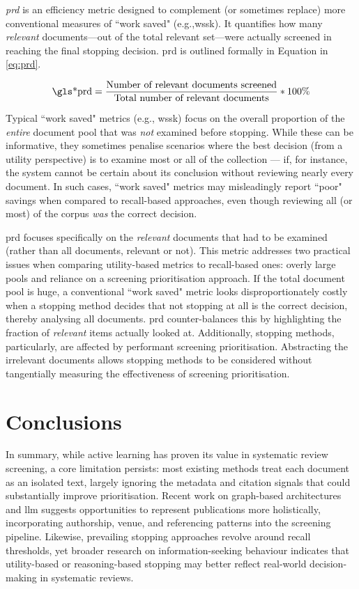 \documentclass[10pt,oneside]{book}
\begin{document}
\emph{\gls*{prd}} is an efficiency metric designed to complement (or sometimes replace) more conventional measures of ``work saved" (e.g.,\gls*{wssk}). It quantifies how many \emph{relevant} documents—out of the total relevant set—were actually screened in reaching the final stopping decision. \gls*{prd} is outlined formally in Equation in \ref{eq:prd}.

\begin{equation}
\text{\gls*{prd}} = \frac{\text{Number of relevant documents screened}}{\text{Total number of relevant documents}} * 100\%
\label{eq:prd}
\end{equation}

Typical ``work saved" metrics (e.g., \gls*{wssk}) focus on the overall proportion of the \emph{entire} document pool that was \emph{not} examined before stopping. While these can be informative, they sometimes penalise scenarios where the best decision (from a utility perspective) is to examine most or all of the collection — if, for instance, the system cannot be certain about its conclusion without reviewing nearly every document. In such cases, ``work saved" metrics may misleadingly report ``poor" savings when compared to recall-based approaches, even though reviewing all (or most) of the corpus \emph{was} the correct decision.

\gls*{prd} focuses specifically on the \emph{relevant} documents that had to be examined (rather than all documents, relevant or not). This metric addresses two practical issues when comparing utility-based metrics to recall-based ones: overly large pools and reliance on a screening prioritisation approach. If the total document pool is huge, a conventional ``work saved" metric looks disproportionately costly when a stopping method decides that not stopping at all is the correct decision, thereby analysing all documents. \gls*{prd} counter-balances this by highlighting the fraction of \emph{relevant} items actually looked at. Additionally, stopping methods, particularly, are affected by performant screening prioritisation. Abstracting the irrelevant documents allows stopping methods to be considered without tangentially measuring the effectiveness of screening prioritisation.


\section{Conclusions}

In summary, while active learning has proven its value in systematic review screening, a core limitation persists: most existing methods treat each document as an isolated text, largely ignoring the metadata and citation signals that could substantially improve prioritisation. Recent work on graph-based architectures and \gls*{llm} suggests opportunities to represent publications more holistically, incorporating authorship, venue, and referencing patterns into the screening pipeline. Likewise, prevailing stopping approaches revolve around recall thresholds, yet broader research on information-seeking behaviour indicates that utility-based or reasoning-based stopping may better reflect real-world decision-making in systematic reviews.
\end{document}
